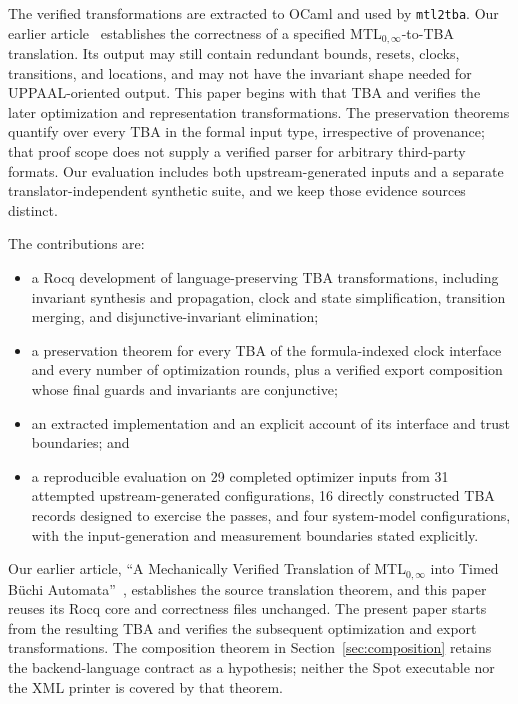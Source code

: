 \documentclass{ieeeaccess}
\begin{document}
The verified transformations are extracted to OCaml and used by \texttt{mtl2tba}. Our earlier article~\cite{fares_bodeveix_mtl_translation} establishes the correctness of a specified MTL$_{0,\infty}$-to-TBA translation. Its output may still contain redundant bounds, resets, clocks, transitions, and locations, and may not have the invariant shape needed for UPPAAL-oriented output. This paper begins with that TBA and verifies the later optimization and representation transformations. The preservation theorems quantify over every TBA in the formal input type, irrespective of provenance; that proof scope does not supply a verified parser for arbitrary third-party formats. Our evaluation includes both upstream-generated inputs and a separate translator-independent synthetic suite, and we keep those evidence sources distinct.

The contributions are:
\begin{itemize}[leftmargin=*]
  \item a Rocq development of language-preserving TBA transformations, including invariant synthesis and propagation, clock and state simplification, transition merging, and disjunctive-invariant elimination;
  \item a preservation theorem for every TBA of the formula-indexed clock interface and every number of optimization rounds, plus a verified export composition whose final guards and invariants are conjunctive;
  \item an extracted implementation and an explicit account of its interface and trust boundaries; and
  \item a reproducible evaluation on 29 completed optimizer inputs from 31 attempted upstream-generated configurations, 16 directly constructed TBA records designed to exercise the passes, and four system-model configurations, with the input-generation and measurement boundaries stated explicitly.
\end{itemize}
Our earlier article, ``A Mechanically Verified Translation of MTL$_{0,\infty}$ into Timed B\"uchi Automata''~\cite{fares_bodeveix_mtl_translation}, establishes the source translation theorem, and this paper reuses its Rocq core and correctness files unchanged. The present paper starts from the resulting TBA and verifies the subsequent optimization and export transformations. The composition theorem in Section~\ref{sec:composition} retains the backend-language contract as a hypothesis; neither the Spot executable nor the XML printer is covered by that theorem.
\end{document}

